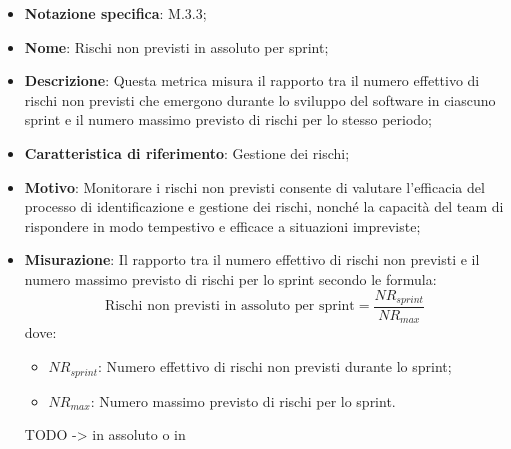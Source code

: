 \begin{itemize}
    \item \textbf{Notazione specifica}: M.3.3;
    \item \textbf{Nome}: Rischi non previsti in assoluto per sprint;
    \item \textbf{Descrizione}: Questa metrica misura il rapporto tra il numero effettivo di rischi non previsti che emergono durante lo sviluppo del software in ciascuno sprint e il numero massimo previsto di rischi per lo stesso periodo;
    \item \textbf{Caratteristica di riferimento}: Gestione dei rischi;
    \item \textbf{Motivo}: Monitorare i rischi non previsti consente di valutare l'efficacia del processo di identificazione e gestione dei rischi, nonché la capacità del team di rispondere in modo tempestivo e efficace a situazioni impreviste;
    \item \textbf{Misurazione}: Il rapporto tra il numero effettivo di rischi non previsti e il numero massimo previsto di rischi per lo sprint secondo le formula:
    \[
        \text{Rischi non previsti in assoluto per sprint} =\frac{NR_{sprint}}{NR_{max}} 
    \]
    dove:
    \begin{itemize}
        \item $NR_{sprint}$: Numero effettivo di rischi non previsti durante lo sprint;
        \item $NR_{max}$: Numero massimo previsto di rischi per lo sprint.
    \end{itemize}

    TODO -> in assoluto o in %
\end{itemize}
